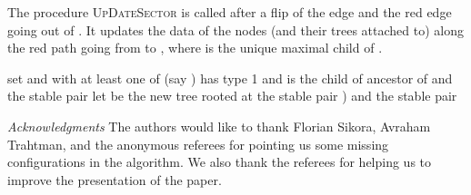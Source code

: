 \documentclass[11pt,a4paper]{article}
\begin{document}
The procedure \textsc{UpDateSector} is called
after a flip of the edge  and the red edge going out of . It
updates the data of the nodes (and their trees attached to) along the
red path going from  to , where  is the unique maximal
child of .

\begin{small}
\begin{codebox}
\li  set  and  with 
\li  \If at least one of  (say ) has type 1 and  is the child of  ancestor of 
\li      \Then 
\li            {} \li            \Return  and the stable pair 
\li       \Else {} 
\li             let  be the new tree rooted at 
\li             \If    
\label{li:FlipEdgesChild-calcul}
\li                        \Then \Return the stable pair 
\li                        \Else  )
\li                              {}   
\li                              \Return  and the stable pair 
                 \End
          \End
      \End
\end{codebox}
\end{small}



\noindent \emph{Acknowledgments} The authors would like to thank
Florian Sikora, Avraham Trahtman, and the anonymous referees for 
pointing us some missing configurations in the algorithm.
We also thank the referees for helping us to improve the presentation
of the paper.



\end{document}

